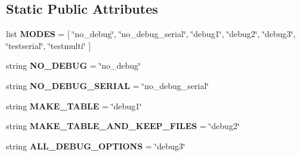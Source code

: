\subsection*{Static Public Attributes}
\begin{DoxyCompactItemize}
\item 
list {\bfseries M\+O\+D\+ES} = \mbox{[} \char`\"{}no\+\_\+debug\char`\"{}, \char`\"{}no\+\_\+debug\+\_\+serial\char`\"{}, \char`\"{}debug1\char`\"{}, \char`\"{}debug2\char`\"{}, \char`\"{}debug3\char`\"{}, \char`\"{}testserial\char`\"{}, \char`\"{}testmulti\char`\"{} \mbox{]}\hypertarget{classnegui_1_1pgdriveneestimator_1_1DebugMode_a7f3d898bacc395557b8cb40337cfa7e6}{}\label{classnegui_1_1pgdriveneestimator_1_1DebugMode_a7f3d898bacc395557b8cb40337cfa7e6}

\item 
string {\bfseries N\+O\+\_\+\+D\+E\+B\+UG} = \char`\"{}no\+\_\+debug\char`\"{}\hypertarget{classnegui_1_1pgdriveneestimator_1_1DebugMode_a68f03775793d9894bdb28c34f9b33a0c}{}\label{classnegui_1_1pgdriveneestimator_1_1DebugMode_a68f03775793d9894bdb28c34f9b33a0c}

\item 
string {\bfseries N\+O\+\_\+\+D\+E\+B\+U\+G\+\_\+\+S\+E\+R\+I\+AL} = \char`\"{}no\+\_\+debug\+\_\+serial\char`\"{}\hypertarget{classnegui_1_1pgdriveneestimator_1_1DebugMode_a76e405def4b66e6270793b8b9a274cb3}{}\label{classnegui_1_1pgdriveneestimator_1_1DebugMode_a76e405def4b66e6270793b8b9a274cb3}

\item 
string {\bfseries M\+A\+K\+E\+\_\+\+T\+A\+B\+LE} = \char`\"{}debug1\char`\"{}\hypertarget{classnegui_1_1pgdriveneestimator_1_1DebugMode_ad287b36021099229f7f4fc86ebc5774e}{}\label{classnegui_1_1pgdriveneestimator_1_1DebugMode_ad287b36021099229f7f4fc86ebc5774e}

\item 
string {\bfseries M\+A\+K\+E\+\_\+\+T\+A\+B\+L\+E\+\_\+\+A\+N\+D\+\_\+\+K\+E\+E\+P\+\_\+\+F\+I\+L\+ES} = \char`\"{}debug2\char`\"{}\hypertarget{classnegui_1_1pgdriveneestimator_1_1DebugMode_a9fb4c700600776a72a359483a08928ea}{}\label{classnegui_1_1pgdriveneestimator_1_1DebugMode_a9fb4c700600776a72a359483a08928ea}

\item 
string {\bfseries A\+L\+L\+\_\+\+D\+E\+B\+U\+G\+\_\+\+O\+P\+T\+I\+O\+NS} = \char`\"{}debug3\char`\"{}\hypertarget{classnegui_1_1pgdriveneestimator_1_1DebugMode_a9f3faea66935c3978c447de9baf0f144}{}\label{classnegui_1_1pgdriveneestimator_1_1DebugMode_a9f3faea66935c3978c447de9baf0f144}


\end{DoxyCompactItemize}
